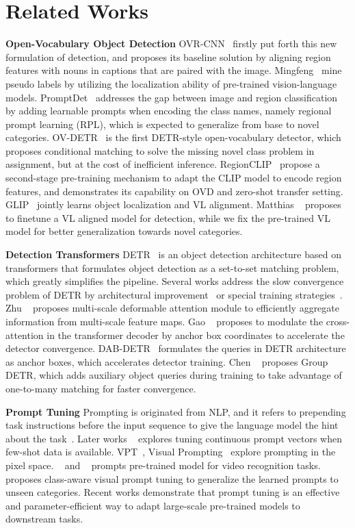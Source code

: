 \documentclass[10pt,twocolumn,letterpaper]{article}
\begin{document}
\section{Related Works}
\label{sec:related}
\noindent\textbf{Open-Vocabulary Object Detection}
OVR-CNN~\cite{OVRCNN} firstly put forth this new formulation of detection, and proposes its baseline solution by aligning region features with nouns in captions that are paired with the image. 
Mingfeng~\cite{mingfeng} \etal mine pseudo labels by utilizing the localization ability of pre-trained vision-language models. 
PromptDet~\cite{promptdet} addresses the gap between image and region classification by adding learnable prompts when encoding the class names, namely regional prompt learning (RPL), which is expected to generalize from base to novel categories. 
OV-DETR~\cite{OVDETR} is the first DETR-style open-vocabulary detector, which proposes conditional matching to solve the missing novel class problem in assignment, but at the cost of inefficient inference.
RegionCLIP~\cite{regionclip} propose a second-stage pre-training mechanism to adapt the CLIP model to encode region features, and demonstrates its capability on OVD and zero-shot transfer setting.
GLIP~\cite{glip} jointly learns object localization and VL alignment. Matthias \etal~\cite{simple} proposes to finetune a VL aligned model for detection, while we fix the pre-trained VL model for better generalization towards novel categories.

\noindent\textbf{Detection Transformers}
DETR~\cite{DETR} is an object detection architecture based on transformers that formulates object detection as a set-to-set matching problem, which greatly simplifies the pipeline. 
Several works address the slow convergence problem of DETR by architectural improvement~\cite{deformable, SMCA, dabdetr, SAMDETR} or special training strategies~\cite{groupdetr, hybridmatching}. 
Zhu \etal~\cite{deformable} proposes multi-scale deformable attention module to efficiently aggregate information from multi-scale feature maps.
Gao \etal~\cite{SMCA} proposes to modulate the cross-attention in the transformer decoder by anchor box coordinates to accelerate the detector convergence.
DAB-DETR~\cite{dabdetr} formulates the queries in DETR architecture as anchor boxes, which accelerates detector training.
Chen \etal~\cite{SAMDETR} proposes Group DETR, which adds auxiliary object queries during training to take advantage of one-to-many matching for faster convergence.

\noindent\textbf{Prompt Tuning}
Prompting is originated from NLP, and it refers to prepending task instructions before the input sequence to give the language model the hint about the task~\cite{gpt3}. 
Later works ~\cite{prefixtuning, ptuningv2} explores tuning continuous prompt vectors when few-shot data is available.
VPT~\cite{vpt}, Visual Prompting~\cite{VisualPM, bahng2022visual} explore prompting in the pixel space. 
~\cite{video1} and ~\cite{video2} prompts pre-trained model for video recognition tasks. 
~\cite{classaware} proposes class-aware visual prompt tuning to generalize the learned prompts to unseen categories.
Recent works demonstrate that prompt tuning is an effective and parameter-efficient way to adapt large-scale pre-trained models to downstream tasks.
\end{document}
